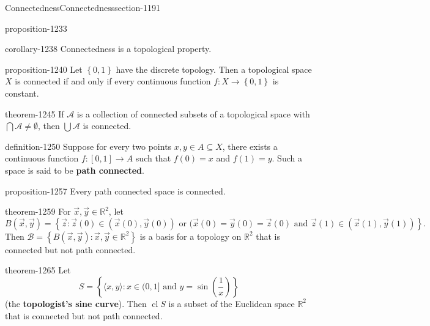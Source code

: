 \documentclass[oneside,10pt,]{article}
\newcommand{\terminology}[1]{\textbf{#1}}
\newcommand{\tuple}[1]{\langle #1 \rangle}
\newcommand{\mb}{\mathbb}
\newcommand{\mc}{\mathcal}
\newcommand{\cl}{\operatorname{cl}}
\newcommand{\setBuilder}[2]{\left\{#1:#2\right\}}
\newcommand{\setList}[1]{\left\{#1\right\}}
\begin{document}
\begin{sectionptx}{Connectedness}{}{Connectedness}{}{}{section-1191}
\begin{proposition}{}{}{proposition-1233}
\end{proposition}
\begin{corollary}{}{}{corollary-1238}%
\hypertarget{p-1239}{}%
Connectedness is a topological property.%
\end{corollary}
\begin{proposition}{}{}{proposition-1240}%
\hypertarget{p-1241}{}%
Let \(\setList{0,1}\) have the discrete topology. Then a topological space \(X\) is connected if and only if every continuous function \(f:X\to\setList{0,1}\) is constant.%
\end{proposition}
\begin{theorem}{}{}{theorem-1245}%
\hypertarget{p-1246}{}%
If \(\mc A\) is a collection of connected subsets of a topological space with \(\bigcap\mc A\not=\emptyset\), then \(\bigcup\mc A\) is connected.%
\end{theorem}
\begin{definition}{}{definition-1250}%
\hypertarget{p-1251}{}%
Suppose for every two points \(x,y\in A\subseteq X\), there exists a continuous function \(f:[0,1]\to A\) such that \(f(0)=x\) and \(f(1)=y\). Such a space is said to be \terminology{path connected}.%
\end{definition}
\begin{proposition}{}{}{proposition-1257}%
\hypertarget{p-1258}{}%
Every path connected space is connected.%
\end{proposition}
\begin{theorem}{}{}{theorem-1259}%
\hypertarget{p-1260}{}%
For \(\vec x,\vec y\in\mb R^2\), let%
\begin{equation*}
B(\vec x,\vec y)=\setBuilder{\vec z}{\vec z(0)\in(\vec x(0),\vec y(0))
\text{ or } (\vec x(0)=\vec y(0)=\vec z(0) \text{ and }
\vec z(1)\in(\vec x(1),\vec y(1))}\text{.}
\end{equation*}
Then \(\mc B=\setBuilder{B(\vec x,\vec y)}{\vec x,\vec y\in\mb R^2}\) is a basis for a topology on \(\mb R^2\) that is connected but not path connected.%
\end{theorem}
\begin{theorem}{}{}{theorem-1265}%
\hypertarget{p-1266}{}%
Let%
\begin{equation*}
S=
\setBuilder{\tuple{x,y}}{x\in(0,1]\text{ and }
y=\sin\left(\frac{1}{x}\right)}
\end{equation*}
(the \terminology{topologist's sine curve}). Then \(\cl S\) is a subset of the Euclidean space \(\mb R^2\) that is connected but not path connected.%
\end{theorem}
\end{sectionptx}
\end{document}

